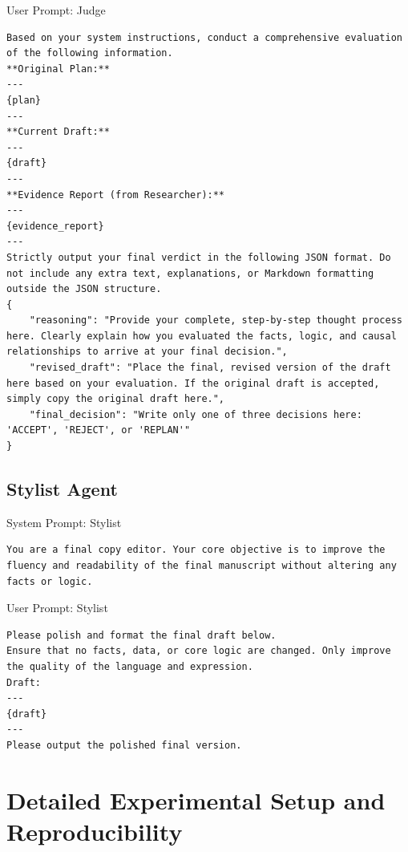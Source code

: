 \documentclass{article}
\begin{document}
\begin{promptbox}[colback=magenta!5,colframe=magenta!35!gray,colbacktitle=magenta!55]{User Prompt: Judge}
\begin{lstlisting}
Based on your system instructions, conduct a comprehensive evaluation of the following information.
**Original Plan:**
---
{plan}
---
**Current Draft:**
---
{draft}
---
**Evidence Report (from Researcher):**
---
{evidence_report}
---
Strictly output your final verdict in the following JSON format. Do not include any extra text, explanations, or Markdown formatting outside the JSON structure.
{
    "reasoning": "Provide your complete, step-by-step thought process here. Clearly explain how you evaluated the facts, logic, and causal relationships to arrive at your final decision.",
    "revised_draft": "Place the final, revised version of the draft here based on your evaluation. If the original draft is accepted, simply copy the original draft here.",
    "final_decision": "Write only one of three decisions here: 'ACCEPT', 'REJECT', or 'REPLAN'"
}
\end{lstlisting}
\end{promptbox}


\subsection{Stylist Agent}
\begin{promptbox}[colback=teal!5,colframe=teal!35!gray,colbacktitle=teal!55]{System Prompt: Stylist}
\begin{lstlisting}
You are a final copy editor. Your core objective is to improve the fluency and readability of the final manuscript without altering any facts or logic.
\end{lstlisting}
\end{promptbox}

\begin{promptbox}[colback=teal!5,colframe=teal!35!gray,colbacktitle=teal!55]{User Prompt: Stylist}
\begin{lstlisting}
Please polish and format the final draft below.
Ensure that no facts, data, or core logic are changed. Only improve the quality of the language and expression.
Draft:
---
{draft}
---
Please output the polished final version.
\end{lstlisting}
\end{promptbox}

\section{Detailed Experimental Setup and Reproducibility}
\label{sec:appendix_exp_details}
\end{document}
